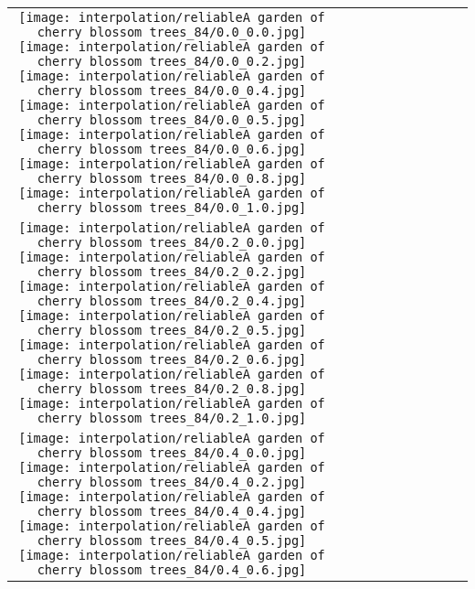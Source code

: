 \documentclass[10pt,twocolumn,letterpaper]{article}
\begin{document}
\begin{figure*}[tb!]
    \centering
    \setlength{\tabcolsep}{0.5pt}
    {\small
    \renewcommand{\arraystretch}{0.5} 
    \begin{tabular}{c c c c c c c c c c}
    \captionsetup{type=figure, font=scriptsize}
    \raisebox{0.1in}{\rotatebox{90}{\small \emph{$0.0$}
 }}
  \texttt{[image: interpolation/reliableA garden of cherry blossom trees\_84/0.0\_0.0.jpg]}
  \texttt{[image: interpolation/reliableA garden of cherry blossom trees\_84/0.0\_0.2.jpg]}
  \texttt{[image: interpolation/reliableA garden of cherry blossom trees\_84/0.0\_0.4.jpg]}
  \texttt{[image: interpolation/reliableA garden of cherry blossom trees\_84/0.0\_0.5.jpg]}
  \texttt{[image: interpolation/reliableA garden of cherry blossom trees\_84/0.0\_0.6.jpg]}
  \texttt{[image: interpolation/reliableA garden of cherry blossom trees\_84/0.0\_0.8.jpg]}
  \texttt{[image: interpolation/reliableA garden of cherry blossom trees\_84/0.0\_1.0.jpg]}
 \tabularnewline
     \raisebox{0.1in}{\rotatebox{90}{\small \emph{$0.2$}
 }}
  \texttt{[image: interpolation/reliableA garden of cherry blossom trees\_84/0.2\_0.0.jpg]}
  \texttt{[image: interpolation/reliableA garden of cherry blossom trees\_84/0.2\_0.2.jpg]}
  \texttt{[image: interpolation/reliableA garden of cherry blossom trees\_84/0.2\_0.4.jpg]}
  \texttt{[image: interpolation/reliableA garden of cherry blossom trees\_84/0.2\_0.5.jpg]}
  \texttt{[image: interpolation/reliableA garden of cherry blossom trees\_84/0.2\_0.6.jpg]}
  \texttt{[image: interpolation/reliableA garden of cherry blossom trees\_84/0.2\_0.8.jpg]}
  \texttt{[image: interpolation/reliableA garden of cherry blossom trees\_84/0.2\_1.0.jpg]}
\tabularnewline
    \raisebox{0.1in}{\rotatebox{90}{\small \emph{$0.4$}
 }}
  \texttt{[image: interpolation/reliableA garden of cherry blossom trees\_84/0.4\_0.0.jpg]}
  \texttt{[image: interpolation/reliableA garden of cherry blossom trees\_84/0.4\_0.2.jpg]}
  \texttt{[image: interpolation/reliableA garden of cherry blossom trees\_84/0.4\_0.4.jpg]}
  \texttt{[image: interpolation/reliableA garden of cherry blossom trees\_84/0.4\_0.5.jpg]}
  \texttt{[image: interpolation/reliableA garden of cherry blossom trees\_84/0.4\_0.6.jpg]}

\end{tabular}}
\end{figure*}
\end{document}
